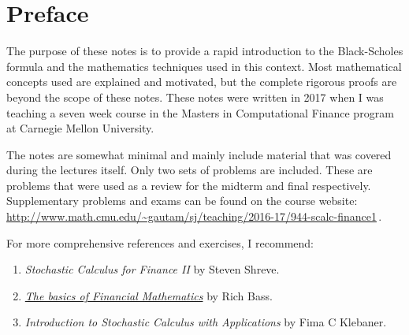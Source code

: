 \endgroup

\chapter*{Preface}

The purpose of these notes is to provide a rapid introduction to the Black-Scholes formula and the mathematics techniques used in this context.
Most mathematical concepts used are explained and motivated, but the complete rigorous proofs are beyond the scope of these notes.
These notes were written in 2017 when I was teaching a seven week course in the Masters in Computational Finance program at Carnegie Mellon University.

The notes are somewhat minimal and mainly include material that was covered during the lectures itself.
Only two sets of problems are included.
These are problems that were used as a review for the midterm and final respectively.
Supplementary problems and exams can be found on the course website:
  \url{http://www.math.cmu.edu/~gautam/sj/teaching/2016-17/944-scalc-finance1}\,.

For more comprehensive references and exercises, I recommend:
\begin{enumerate}
  \item
    \emph{Stochastic Calculus for Finance II} by Steven Shreve.
  \item 
    \emph{\href{http://bass.math.uconn.edu/finlmath.pdf}{The basics of Financial Mathematics}} by Rich Bass.
  \item
    \emph{Introduction to Stochastic Calculus with Applications} by Fima C Klebaner.
\end{enumerate}

\tableofcontents\thispagestyle{empty}
\mainmatter
\hypersetup{pageanchor=true}

